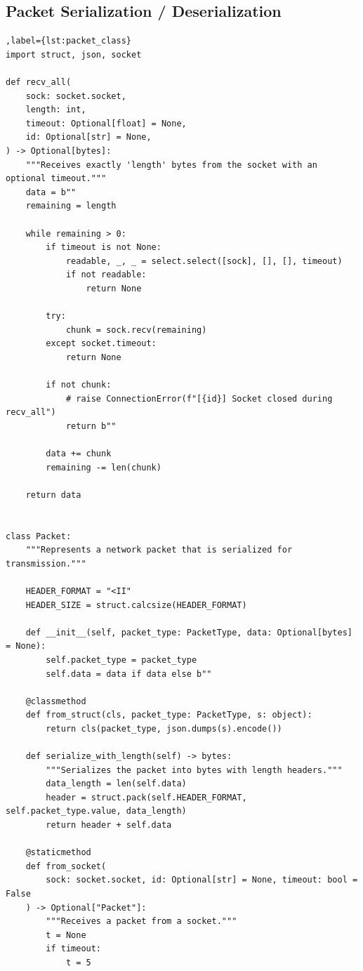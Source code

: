 \documentclass[11pt,a4paper]{article}
\begin{document}
\subsection{Packet Serialization / Deserialization}
\begin{lstlisting}[caption={\texttt{Packet} class and helper}],label={lst:packet_class}
import struct, json, socket

def recv_all(
    sock: socket.socket,
    length: int,
    timeout: Optional[float] = None,
    id: Optional[str] = None,
) -> Optional[bytes]:
    """Receives exactly 'length' bytes from the socket with an optional timeout."""
    data = b""
    remaining = length

    while remaining > 0:
        if timeout is not None:
            readable, _, _ = select.select([sock], [], [], timeout)
            if not readable:
                return None

        try:
            chunk = sock.recv(remaining)
        except socket.timeout:
            return None

        if not chunk:
            # raise ConnectionError(f"[{id}] Socket closed during recv_all")
            return b""

        data += chunk
        remaining -= len(chunk)

    return data


class Packet:
    """Represents a network packet that is serialized for transmission."""

    HEADER_FORMAT = "<II"
    HEADER_SIZE = struct.calcsize(HEADER_FORMAT)

    def __init__(self, packet_type: PacketType, data: Optional[bytes] = None):
        self.packet_type = packet_type
        self.data = data if data else b""

    @classmethod
    def from_struct(cls, packet_type: PacketType, s: object):
        return cls(packet_type, json.dumps(s).encode())

    def serialize_with_length(self) -> bytes:
        """Serializes the packet into bytes with length headers."""
        data_length = len(self.data)
        header = struct.pack(self.HEADER_FORMAT, self.packet_type.value, data_length)
        return header + self.data

    @staticmethod
    def from_socket(
        sock: socket.socket, id: Optional[str] = None, timeout: bool = False
    ) -> Optional["Packet"]:
        """Receives a packet from a socket."""
        t = None
        if timeout:
            t = 5


\end{lstlisting}
\end{document}

